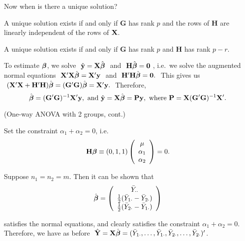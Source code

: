 Now when is there a unique solution?

\btheo
A unique solution exists if and only if $\mathbf G$ has rank $p$ and
the rows of $\mathbf H$ are linearly independent of the rows of
$\mathbf{X}$.
\estheo

\bstheo
A unique solution exists if and only if $\mathbf G$ has rank $p$ and
$\mathbf H$ has rank $p-r$.
\etheo

To estimate $\mbox{\boldmath $\beta$}$, we solve $\ \hat{\mathbf{y}}=\mathbf{X}\hat{\mbox{\boldmath $\beta$}}\ $ and
$\ \mathbf{H}\hat{\mbox{\boldmath $\beta$}}=\mathbf{0}\ $, i.e.~we solve the augmented
normal equations $\ \bfX'\bfX\hat{\bfbet} = \bfX'\bfy\ $ and $\
\mathbf{H'H} \hat{\mbox{\boldmath $\beta$}} = \mathbf{0}.\ $ This gives us  $\
(\mathbf{X}'\mathbf{X}+\mathbf{H'H}) \hat{\mbox{\boldmath $\beta$}}= (\mathbf{G'G})
\hat{\mbox{\boldmath $\beta$}}=\mathbf{X}'\mathbf{y}.\ $ Therefore,
$$
\hat{\mbox{\boldmath $\beta$}}=(\mathbf{G'G})^{-1}\mathbf{X}'\mathbf{y},
\
\mbox{and}
\
\hat{\mathbf{y}}=\mathbf{X}\hat{\mbox{\boldmath $\beta$}}=\mathbf{P}\mathbf{y},
\
\mbox{where}
\
\mathbf{P}=\mathbf{X}(\mathbf{G'G})^{-1}\mathbf{X}'.
$$

\bexa
(One-way ANOVA with 2 groups, cont.) 

Set the constraint $\alpha_1+\alpha_2=0$, i.e.
$$
\mathbf{H}\mbox{\boldmath $\beta$}\equiv (0, 1, 1)
	\left(\begin{array}{c}\mu\\\alpha_1\\\alpha_2\end{array}\right)=0.
$$

Suppose $n_1=n_2=m$.  Then it can be shown that
$$
\hat{\mbox{\boldmath $\beta$}}=
	\left(\begin{array}{c}
		\bar{Y}_{\cdot\cdot}\\
		\frac{1}{2}(\bar{Y}_{1\cdot}-\bar{Y}_{2\cdot})\\
		\frac{1}{2}(\bar{Y}_{2\cdot}-\bar{Y}_{1\cdot})\\
	\end{array}\right)
$$ 

satisfies the normal equations, and clearly satisfies the constraint
$\alpha_1+\alpha_2=0$.  Therefore, we have as before $\
\hat{\mathbf{Y}}=\mathbf{X}\hat{\mbox{\boldmath $\beta$}} =(\bar{Y}_{1\cdot}, \ldots,
\bar{Y}_{1\cdot}, \bar{Y}_{2\cdot}, \ldots, \bar{Y}_{2\cdot}) '$.

\eexa


